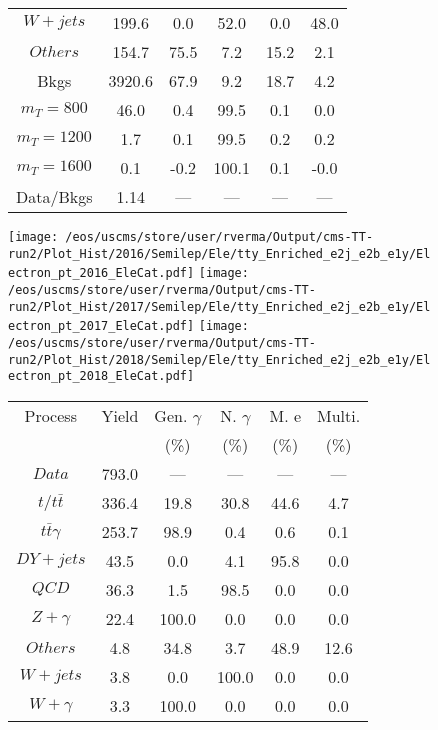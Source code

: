 \begin{figure}
\begin{minipage}[c]{0.32\textwidth}
{\begin{tabular}{cccccc}
$ W+jets $ &  199.6 &  0.0 &  52.0 &  0.0 &  48.0\\
$ Others $ &  154.7 &  75.5 &  7.2 &  15.2 &  2.1\\
Bkgs &  3920.6 &  67.9 &  9.2 &  18.7 &  4.2\\
$ m_{T} = 800 $ &  46.0 &  0.4 &  99.5 &  0.1 &  0.0\\
$ m_{T} = 1200 $ &  1.7 &  0.1 &  99.5 &  0.2 &  0.2\\
$ m_{T} = 1600 $ &  0.1 &  -0.2 &  100.1 &  0.1 &  -0.0\\
Data/Bkgs &  1.14 &  --- &  --- &  --- &  ---\\
\hline
\end{tabular}
}
\end{minipage}
\end{figure}

\begin{figure}
\centering
\texttt{[image: /eos/uscms/store/user/rverma/Output/cms-TT-run2/Plot\_Hist/2016/Semilep/Ele/tty\_Enriched\_e2j\_e2b\_e1y/Electron\_pt\_2016\_EleCat.pdf]}
\texttt{[image: /eos/uscms/store/user/rverma/Output/cms-TT-run2/Plot\_Hist/2017/Semilep/Ele/tty\_Enriched\_e2j\_e2b\_e1y/Electron\_pt\_2017\_EleCat.pdf]}
\texttt{[image: /eos/uscms/store/user/rverma/Output/cms-TT-run2/Plot\_Hist/2018/Semilep/Ele/tty\_Enriched\_e2j\_e2b\_e1y/Electron\_pt\_2018\_EleCat.pdf]}
\begin{minipage}[c]{0.32\textwidth}
\centering
\tiny{
\begin{tabular}{cccccc}
\hline
Process & Yield & Gen. $\gamma$ & N. $\gamma$ & M. e & Multi. \\
 &  & (\%) & (\%) & (\%) & (\%)  \\
\hline
                                                                      $ Data $ &  793.0 &  --- &  --- &  --- &  ---\\
$ t/t\bar{t} $ &  336.4 &  19.8 &  30.8 &  44.6 &  4.7\\
$ t\bar{t}\gamma $ &  253.7 &  98.9 &  0.4 &  0.6 &  0.1\\
$ DY+jets $ &  43.5 &  0.0 &  4.1 &  95.8 &  0.0\\
$ QCD $ &  36.3 &  1.5 &  98.5 &  0.0 &  0.0\\
$ Z+\gamma $ &  22.4 &  100.0 &  0.0 &  0.0 &  0.0\\
$ Others $ &  4.8 &  34.8 &  3.7 &  48.9 &  12.6\\
$ W+jets $ &  3.8 &  0.0 &  100.0 &  0.0 &  0.0\\
$ W+\gamma $ &  3.3 &  100.0 &  0.0 &  0.0 &  0.0\\

\end{tabular}}
\end{minipage}
\end{figure}
